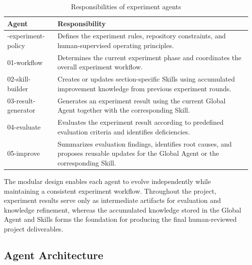 \begin{table}[H]
\centering
\caption{Responsibilities of experiment agents}
\label{tab:experiment-agents}

\renewcommand{\arraystretch}{1.25}

\begin{tabularx}{\linewidth}{|>{\ttfamily\raggedright\arraybackslash}p{4.4cm}|X|}
\hline

\textbf{Agent}
&
\textbf{Responsibility}
\\
\hline

00-experiment-policy
&
Defines the experiment rules, repository constraints, and human-supervised operating principles.
\\
\hline

01-workflow
&
Determines the current experiment phase and coordinates the overall experiment workflow.
\\
\hline

02-skill-builder
&
Creates or updates section-specific Skills using accumulated improvement knowledge from previous experiment rounds.
\\
\hline

03-result-generator
&
Generates an experiment result using the current Global Agent together with the corresponding Skill.
\\
\hline

04-evaluate
&
Evaluates the experiment result according to predefined evaluation criteria and identifies deficiencies.
\\
\hline

05-improve
&
Summarizes evaluation findings, identifies root causes, and proposes reusable updates for the Global Agent or the corresponding Skill.
\\
\hline

\end{tabularx}

\end{table}

The modular design enables each agent to evolve independently while maintaining a consistent experiment workflow. Throughout the project, experiment results serve only as intermediate artifacts for evaluation and knowledge refinement, whereas the accumulated knowledge stored in the Global Agent and Skills forms the foundation for producing the final human-reviewed project deliverables.

\subsection{Agent Architecture}

